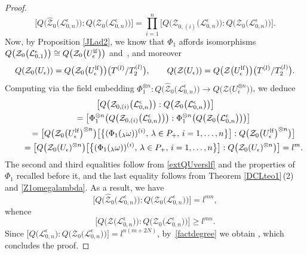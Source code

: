 \documentclass[pdftex]{sigma}
\numberwithin{equation}{section}
\theoremstyle{definition}
\newcommand{\e}{\epsilon}
\newcommand{\Ll}{{\mathcal L}}
\newcommand{\ra}{\rightarrow}
\begin{document}
\begin{proof}
\[\big[Q\big(\hat{\mathcal{Z}}_{0}\bigl(\Ll_{0,n}^\e\bigr)\big):Q\bigl(\mathcal{Z}_0\bigl(\Ll_{0,n}^\e\bigr)\bigr)\big] = \prod_{i=1}^n \bigl[Q\bigl(\mathcal{Z}_{0,(i)}\bigl(\Ll_{0,n}^\e\bigr)\bigr):Q\bigl(\mathcal{Z}_0\bigl(\Ll_{0,n}^\e\bigr)\bigr)\bigr].\]
Now, by Proposition \ref{JLad2}, we know that $\Phi_1$ affords isomorphisms $Q\bigl(\mathcal{Z}_0\bigl(\Ll_{0,1}^\e\bigr)\bigr)\cong Q\big(\mathcal{Z}_0\big(U_\e^{\rm lf}\big)\big)$ and~\smash{$Q(\mathcal{Z}\bigl(\Ll_{0,1}^\e\bigr))\cong Q\big(\mathcal{Z}\big(U_\e^{\rm lf}\big)\big)$}, and moreover
\begin{equation}\label{extQUverslf}
Q(\mathcal{Z}_0(U_\e)) = Q\big(\mathcal{Z}_0\big(U_\e^{\rm lf}\big)\big)\big(T^{(l)}/T_{2}^{(l)}\big), \qquad Q(\mathcal{Z}(U_\e)) = Q\big(\mathcal{Z}\big(U_\e^{\rm lf}\big)\big)\big(T^{(l)}/T_{2}^{(l)}\big).
\end{equation}
Computing via the field embedding $\Phi_1^{\otimes n}\colon Q\big(\hat{\mathcal{Z}}_{0}\bigl(\Ll_{0,n}^\e\bigr)\big) \ra Q\bigl(\mathcal{Z}\bigl(U_\e^{\otimes n}\bigr)\bigr)$, we deduce
\begin{gather*}
\bigl[Q\bigl(\mathcal{Z}_{0,(i)}\bigl(\Ll_{0,n}^\e\bigr)\bigr) :Q\bigl(\mathcal{Z}_0\bigl(\Ll_{0,n}^\e\bigr)\bigr)\bigr]\\
\qquad
 = \bigl[\Phi_1^{\otimes n}\bigl(Q\bigl(\mathcal{Z}_{0,(i)}\bigl(\Ll_{0,n}^\e\bigr)\bigr)\bigr):\Phi_1^{\otimes n}\bigl(Q\bigl(\mathcal{Z}_0\bigl(\Ll_{0,n}^\e\bigr)\bigr)\bigr)\bigr]\\
\qquad = \big[Q\big(\mathcal{Z}_0\big(U_\e^{\rm lf}\big)^{\otimes n}\big)\big[\big\{(\Phi_1({}_{\lambda}\omega))^{(i)},\,\lambda\in P_+, \, i=1,\dots,n\big\}\big]:Q\big(\mathcal{Z}_0\big(U_\e^{\rm lf}\big)^{\otimes n}\big)\big]\\
\qquad = \big[Q\big(\mathcal{Z}_0(U_\e)^{\otimes n}\big)\big[\big\{(\Phi_1({}_{\lambda}\omega))^{(i)},\,\lambda\in P_+, \, i=1,\dots,n\big\}\big]:Q\big(\mathcal{Z}_0(U_\e)^{\otimes n}\big)\big]=l^m.
\end{gather*}
The second and third equalities follow from \eqref{extQUverslf} and the properties of $\Phi_1$ recalled before it, and the last equality follows from Theorem \ref{DCLteo1}\,(2) and \eqref{Z1omegalambda}. As a result, we have
\[
\big[Q\big(\hat{\mathcal{Z}}_{0}\bigl(\Ll_{0,n}^\e\bigr)\big):Q\bigl(\mathcal{Z}_0\bigl(\Ll_{0,n}^\e\bigr)\bigr)\big]=l^{mn},
\]
 whence \[
 \bigl[Q\bigl(\mathcal{Z}\bigl(\Ll_{0,n}^\e\bigr)\bigr):Q\bigl(\mathcal{Z}_0\bigl(\Ll_{0,n}^\e\bigr)\bigr)\bigr]\geq l^{mn}.
 \]
Since $\bigl[Q\bigl(\Ll_{0,n}^\e\bigr):Q\bigl(\mathcal{Z}_0\bigl(\Ll_{0,n}^\e\bigr)\bigr)\bigr] = l^{n(m+2N)}$, by~\eqref{factdegree} we obtain , which concludes the proof.
\end{proof}
\end{document}
